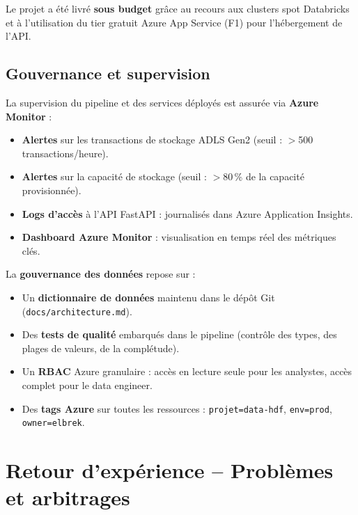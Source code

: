 \documentclass[11pt,a4paper]{article}
\begin{document}
Le projet a été livré \textbf{sous budget} grâce au recours aux clusters spot Databricks et à
l'utilisation du tier gratuit Azure App Service (F1) pour l'hébergement de l'API.

\subsection{Gouvernance et supervision}

La supervision du pipeline et des services déployés est assurée via \textbf{Azure Monitor} :
\begin{itemize}
  \item \textbf{Alertes} sur les transactions de stockage ADLS Gen2 (seuil : $>$500 transactions/heure).
  \item \textbf{Alertes} sur la capacité de stockage (seuil : $>$80\,\% de la capacité provisionnée).
  \item \textbf{Logs d'accès} à l'API FastAPI : journalisés dans Azure Application Insights.
  \item \textbf{Dashboard Azure Monitor} : visualisation en temps réel des métriques clés.
\end{itemize}

La \textbf{gouvernance des données} repose sur :
\begin{itemize}
  \item Un \textbf{dictionnaire de données} maintenu dans le dépôt Git (\texttt{docs/architecture.md}).
  \item Des \textbf{tests de qualité} embarqués dans le pipeline (contrôle des types, des plages de valeurs, de la complétude).
  \item Un \textbf{RBAC} Azure granulaire : accès en lecture seule pour les analystes, accès complet pour le data engineer.
  \item Des \textbf{tags Azure} sur toutes les ressources : \texttt{projet=data-hdf}, \texttt{env=prod}, \texttt{owner=elbrek}.
\end{itemize}

\section{Retour d'expérience -- Problèmes et arbitrages}
\end{document}
